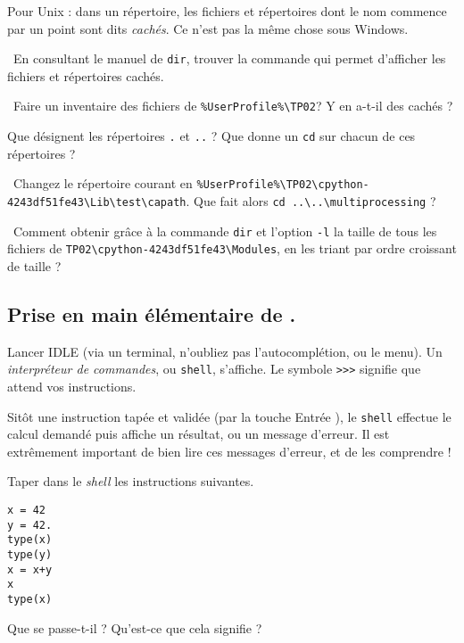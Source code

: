 \medskip 

Pour Unix : dans un répertoire, les fichiers et répertoires dont le nom
commence par un point sont dits \emph{cachés}. Ce n'est pas la même chose sous Windows.

\medskip

\question\ En consultant le manuel de \texttt{dir}, trouver la commande qui
permet d'afficher les fichiers et répertoires cachés.

\medskip

\question\ Faire un inventaire des fichiers de \texttt{\%UserProfile\%\textbackslash TP02}? Y en a-t-il des cachés ? 
  
\medskip

\question{} Que désignent les répertoires \texttt{.} et \texttt{..} ?
Que donne un \texttt{cd} sur chacun de ces répertoires ?

\medskip

\question\ Changez le répertoire courant en 
\texttt{\%UserProfile\%\textbackslash TP02\textbackslash cpython-4243df51fe43\textbackslash Lib\textbackslash test\textbackslash capath}. Que
fait   alors \texttt{cd ..\textbackslash ..\textbackslash multiprocessing} ?

\medskip

\question\ Comment obtenir grâce à la commande
\texttt{dir} et l'option \texttt{-l} la taille de tous les
fichiers de \texttt{TP02\textbackslash cpython-4243df51fe43\textbackslash Modules}, en les triant par ordre
croissant de taille ?

\subsection{Prise en main élémentaire de \python{}.} \label{tp02:sec:python}

Lancer IDLE (via un terminal, n'oubliez pas l'autocomplétion, ou le menu). Un \emph{interpréteur de commandes}, ou \texttt{shell}, s'affiche. 
Le symbole \texttt{>}\texttt{>}\texttt{>} signifie que \python{} attend vos instructions. 

Sitôt une instruction tapée et validée (par la touche \og Entrée \fg{}), le \texttt{shell} effectue le calcul demandé puis affiche un résultat, ou un message d'erreur. 
Il est extrêmement important de bien lire ces messages d'erreur, et de les comprendre ! 

\medskip{}

\question{} Taper dans le \emph{shell} les instructions suivantes. 
\begin{verbatim}
x = 42
y = 42.
type(x)
type(y)
x = x+y
x
type(x)
\end{verbatim}
Que se passe-t-il ? Qu'est-ce que cela signifie ?

